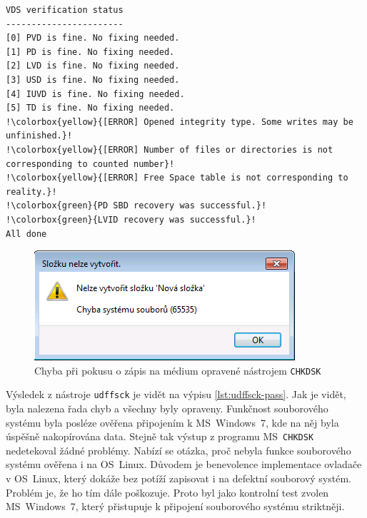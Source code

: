 \begin{lstlisting}
VDS verification status
-----------------------
[0] PVD is fine. No fixing needed.
[1] PD is fine. No fixing needed.
[2] LVD is fine. No fixing needed.
[3] USD is fine. No fixing needed.
[4] IUVD is fine. No fixing needed.
[5] TD is fine. No fixing needed.
!\colorbox{yellow}{[ERROR] Opened integrity type. Some writes may be unfinished.}!
!\colorbox{yellow}{[ERROR] Number of files or directories is not corresponding to counted number}!
!\colorbox{yellow}{[ERROR] Free Space table is not corresponding to reality.}!
!\colorbox{green}{PD SBD recovery was successful.}!
!\colorbox{green}{LVID recovery was successful.}!
All done
\end{lstlisting}
\begin{figure}[b] 
    \centering
    \includegraphics[scale=0.42]{obrazky/win7-error.png}
    \caption{Chyba při pokusu o zápis na médium opravené nástrojem \texttt{CHKDSK}}
    \label{fig:win7-err}
\end{figure}
Výsledek z nástroje \texttt{udffsck} je vidět na výpisu \ref{lst:udffsck-pass}. Jak je vidět, byla nalezena řada chyb a všechny byly opraveny. Funkčnost souborového systému byla posléze ověřena připojením k MS~Windows~7, kde na něj byla úspěšně nakopírována data. Stejně tak výstup z programu MS~\texttt{CHKDSK} nedetekoval žádné problémy. Nabízí se otázka, proč nebyla funkce souborového systému ověřena i na OS~Linux. Důvodem je benevolence implementace ovladače v OS~Linux, který dokáže bez potíží zapisovat i na defektní souborový systém. Problém je, že ho tím dále poškozuje. Proto byl jako kontrolní test zvolen MS~Windows~7, který přistupuje k připojení souborového systému striktněji.

